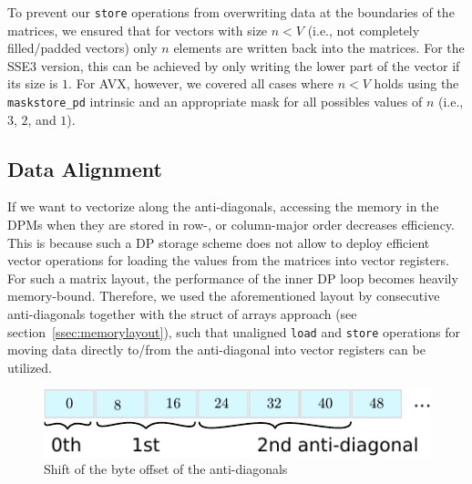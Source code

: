 \documentclass[runningheads,a4paper]{llncs}
\begin{document}
To prevent our \texttt{store} operations from overwriting data at the boundaries
of the matrices, we ensured that for vectors with size $n < V$ (i.e.,
not completely filled/padded vectors) only $n$ elements are written back into the
matrices.  For the SSE3 version, this can be achieved by only writing the lower
part of the vector if its size is $1$.  For AVX, however, we covered all cases
where $n < V$ holds using the \texttt{maskstore\_pd} intrinsic and an appropriate mask
for all possibles values of $n$ (i.e., $3$, $2$, and $1$).

\subsection{Data Alignment}
\label{ssec:dataalignment}

If we want to vectorize along the anti-diagonals, accessing the memory in the DPMs when they are stored in row-, or column-major order 
decreases efficiency. This is because such a DP storage scheme does not allow to deploy efficient vector operations for loading the values from the matrices into vector registers.
For such a matrix layout, the performance of the inner DP loop becomes heavily memory-bound.
Therefore, we used the aforementioned layout by consecutive anti-diagonals together with the struct of arrays approach (see section~\ref{ssec:memorylayout}),
such that unaligned \texttt{load} and \texttt{store} operations for moving data directly to/from the anti-diagonal
into vector registers can be utilized.


\begin{figure}[ht!]
  \centering
  \includegraphics[scale=0.9]{figures/unaligned.pdf}
  \caption{Shift of the byte offset of the anti-diagonals}
  \label{fig:unaligned}
\end{figure}
\end{document}
